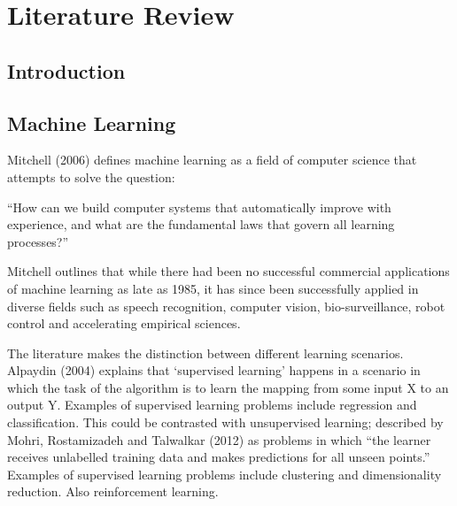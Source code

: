 
\chapter{Literature Review} %

\label{Chapter2} %



\section{Introduction}

\section{Machine Learning}

Mitchell (2006) defines machine learning as a field of computer science that attempts to solve the question:

“How can we build computer systems that automatically improve with experience, and what
are the fundamental laws that govern all learning processes?”

Mitchell outlines that while there had been no successful commercial applications of machine learning as late as 1985, it has since been successfully applied in diverse fields such as speech recognition, computer vision, bio-surveillance, robot control and accelerating empirical sciences.

The literature makes the distinction between different learning scenarios. Alpaydin (2004) explains that ‘supervised learning’ happens in a scenario in which the task of the algorithm is to learn the mapping from some input X to an output Y. Examples of supervised learning problems include regression and classification. This could be contrasted with unsupervised learning; described by Mohri, Rostamizadeh and Talwalkar (2012) as problems in which “the learner receives unlabelled training data and makes predictions for all unseen points.” Examples of supervised learning problems include clustering and dimensionality reduction.
Also reinforcement learning.


